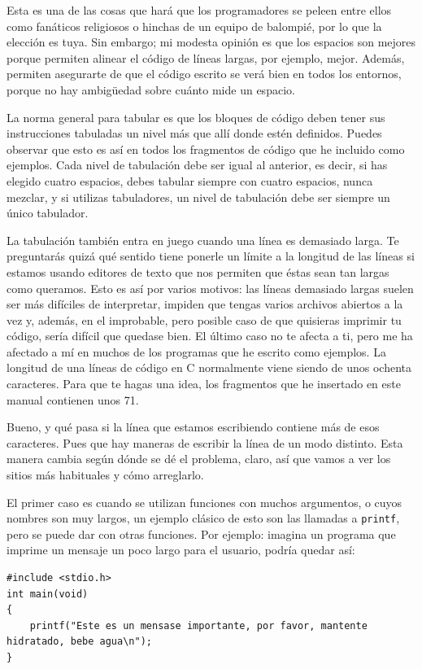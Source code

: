 \documentclass[a4paper]{article}
\begin{document}
Esta es una de las cosas que hará que los programadores se peleen entre ellos
como fanáticos religiosos o hinchas de un equipo de balompié, por lo que la
elección es tuya. Sin embargo; mi modesta opinión es que los espacios son
mejores porque permiten alinear el código de líneas largas, por ejemplo, mejor.
Además, permiten asegurarte de que el código escrito se verá bien en todos los
entornos, porque no hay ambigüedad sobre cuánto mide un espacio.

La norma general para tabular es que los bloques de código deben tener sus
instrucciones tabuladas un nivel más que allí donde estén definidos. Puedes
observar que esto es así en todos los fragmentos de código que he incluido como
ejemplos. Cada nivel de tabulación debe ser igual al anterior, es decir, si has
elegido cuatro espacios, debes tabular siempre con cuatro
espacios, nunca mezclar, y si utilizas tabuladores, un nivel
de tabulación debe ser siempre un único tabulador.

La tabulación también entra en juego cuando una línea es demasiado larga.
Te preguntarás quizá qué sentido tiene ponerle un límite a la longitud de las
líneas si estamos usando editores de texto que nos permiten que éstas sean tan
largas como queramos. Esto es así por varios motivos: las líneas demasiado
largas suelen ser más difíciles de interpretar, impiden que tengas varios
archivos abiertos a la vez y, además, en el improbable, pero posible caso de
que quisieras imprimir tu código, sería difícil que quedase bien. El último
caso no te afecta a ti, pero me ha afectado a mí en muchos de los programas
que he escrito como ejemplos. La longitud de una líneas de código en C
normalmente viene siendo de unos ochenta caracteres. Para que te hagas una idea,
los fragmentos que he insertado en este manual contienen unos 71.

Bueno, y qué pasa si la línea que estamos escribiendo contiene más de esos
caracteres. Pues que hay maneras de escribir la línea de un modo distinto.
Esta manera cambia según dónde se dé el problema, claro, así que vamos a ver
los sitios más habituales y cómo arreglarlo.

El primer caso es cuando se utilizan funciones con muchos argumentos, o cuyos
nombres son muy largos, un ejemplo clásico de esto son las llamadas a
\verb!printf!, pero se puede dar con otras funciones. Por ejemplo: imagina un
programa que imprime un mensaje un poco largo para el usuario, podría quedar
así:

\noindent
\begin{minipage}[H]{\linewidth}
\mbox{}
\begin{lstlisting}[style=C,
caption={Impresión larga},
label={lst:longprint}]
#include <stdio.h>
int main(void)
{
    printf("Este es un mensase importante, por favor, mantente hidratado, bebe agua\n");
}

\end{lstlisting}
\end{minipage}
\end{document}
